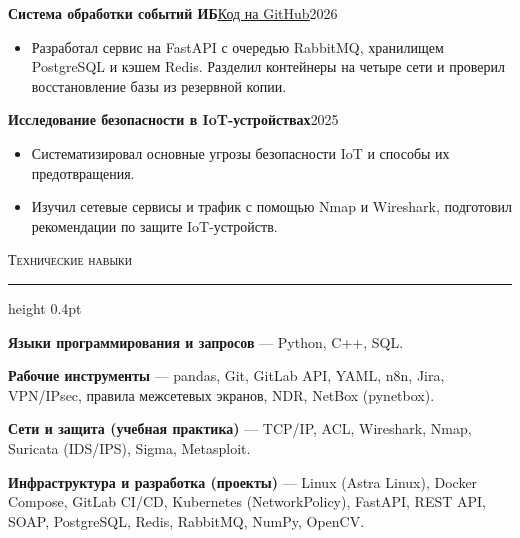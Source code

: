 \documentclass[11pt,letterpaper]{article}
\newcommand{\cvsection}[1]{%
  \par\addvspace{10pt}%
  {\Large\scshape #1\par}\nobreak
  \vspace{4.8pt}\hrule height 0.4pt\nobreak\vspace{4pt}%
}
\newcommand{\entry}[2]{%
  \par\addvspace{3pt}\hspace*{0.15in}\textbf{#1}\hfill #2\hspace*{0.08in}\par
}
\newcommand{\linktext}[2]{\href{#1}{\underline{#2}}}
\begin{document}
\entry{Система обработки событий ИБ}
  {\small\linktext{https://github.com/yalkar/security-event-processing-system}{Код на GitHub}\quad\normalsize 2026}
\begin{itemize}
  \item Разработал сервис на FastAPI с очередью RabbitMQ, хранилищем PostgreSQL и кэшем
    Redis. Разделил контейнеры на четыре сети и проверил восстановление базы из резервной копии.
\end{itemize}

\entry{Исследование безопасности в IoT-устройствах}{2025}
\begin{itemize}
  \item Систематизировал основные угрозы безопасности IoT и способы их предотвращения.
  \item Изучил сетевые сервисы и трафик с помощью Nmap и Wireshark, подготовил
    рекомендации по защите IoT-устройств.
\end{itemize}

\cvsection{Технические навыки}
\begin{list}{}{\setlength{\leftmargin}{0.15in}\setlength{\rightmargin}{0.08in}%
  \setlength{\topsep}{0pt}\setlength{\itemsep}{1pt}\setlength{\parsep}{0pt}}
  \item \textbf{Языки программирования и запросов} — Python, C++, SQL.
  \item \textbf{Рабочие инструменты} — pandas, Git, GitLab API, YAML, n8n, Jira,
    VPN/IPsec, правила межсетевых экранов, NDR, NetBox (pynetbox).
  \item \textbf{Сети и защита (учебная практика)} — TCP/IP, ACL, Wireshark, Nmap,
    Suricata (IDS/IPS), Sigma, Metasploit.
  \item \textbf{Инфраструктура и разработка (проекты)} — Linux (Astra Linux), Docker Compose,
    GitLab CI/CD, Kubernetes (NetworkPolicy), FastAPI, REST API, SOAP, PostgreSQL, Redis,
    RabbitMQ, NumPy, OpenCV.
\end{list}
\end{document}
